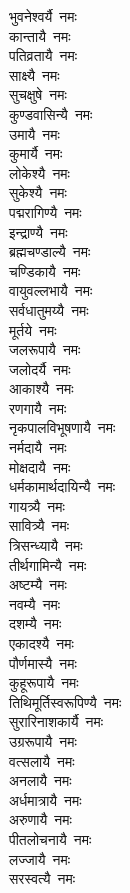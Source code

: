 \begin{flushleft}
\begin{multicols}{2}
भुवनेश्वर्यै~नमः\\
कान्तायै~नमः\\
पतिव्रतायै~नमः\\
साक्ष्यै~नमः\\
सुचक्षुषे~नमः\\
कुण्डवासिन्यै~नमः\\
उमायै~नमः\\
कुमार्यै~नमः\\
लोकेश्यै~नमः\hfill{}\\
सुकेश्यै~नमः\\
पद्मरागिण्यै~नमः\\
इन्द्राण्यै~नमः\\
ब्रह्मचण्डाल्यै~नमः\\
चण्डिकायै~नमः\\
वायुवल्लभायै~नमः\\
सर्वधातुमय्यै~नमः\\
मूर्तये~नमः\\
जलरूपायै~नमः\\
जलोदर्यै~नमः\hfill{}\\
आकाश्यै~नमः\\
रणगायै~नमः\\
नृकपालविभूषणायै~नमः\\
नर्मदायै~नमः\\
मोक्षदायै~नमः\\
धर्मकामार्थदायिन्यै~नमः\\
गायत्र्यै~नमः\\
सावित्र्यै~नमः\\
त्रिसन्ध्यायै~नमः\\
तीर्थगामिन्यै~नमः\hfill{}\\
अष्टम्यै~नमः\\
नवम्यै~नमः\\
दशम्यै~नमः\\
एकादश्यै~नमः\\
पौर्णमास्यै~नमः\\
कुहूरूपायै~नमः\\
तिथिमूर्तिस्वरूपिण्यै~नमः\\
सुरारिनाशकार्यै~नमः\\
उग्ररूपायै~नमः\\
वत्सलायै~नमः\hfill{}\\
अनलायै~नमः\\
अर्धमात्रायै~नमः\\
अरुणायै~नमः\\
पीतलोचनायै~नमः\\
लज्जायै~नमः\\
सरस्वत्यै~नमः\\

\end{multicols}
\end{flushleft}
